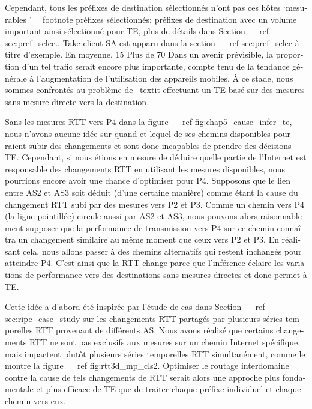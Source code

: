 \begin{otherlanguage}{french}
Cependant, tous les préfixes de destination sélectionnés n'ont pas ces hôtes `mesurables '~ \ footnote {préfixes sélectionnés: préfixes de destination avec un volume important ainsi sélectionné pour TE, plus de détails dans Section ~ \ ref {sec:pref_selec}.}.
Take client SA est apparu dans la section ~ \ ref {sec:pref_selec} à titre d'exemple.
En moyenne, 15%
Plus de 70%
Dans un avenir prévisible, la proportion d'un tel trafic serait encore plus importante, compte tenu de la tendance générale à l'augmentation de l'utilisation des appareils mobiles.
À ce stade, nous sommes confrontés au problème de \ textit {effectuant un TE basé sur des mesures sans mesure directe vers la destination}.

Sans les mesures RTT vers P4 dans la figure ~ \ ref {fig:chap5_cause_infer_te}, nous n'avons aucune idée sur quand et lequel de ses chemins disponibles pourraient subir des changements et sont donc incapables de prendre des décisions TE.
Cependant, si nous étions en mesure de déduire quelle partie de l'Internet est responsable des changements RTT en utilisant les mesures disponibles, nous pourrions encore avoir une chance d'optimiser pour P4.
Supposons que le lien entre AS2 et AS3 soit déduit (d'une certaine manière) comme étant la cause du changement RTT subi par des mesures vers P2 et P3.
Comme un chemin vers P4 (la ligne pointillée) circule aussi par AS2 et AS3, nous pouvons alors raisonnablement supposer que la performance de transmission vers P4 sur ce chemin connaîtra un changement similaire au même moment que ceux vers P2 et P3.
En réalisant cela, nous allons passer à des chemins alternatifs qui restent inchangés pour atteindre P4.
C'est ainsi que la RTT change parce que l'inférence éclaire les variations de performance vers des destinations sans mesures directes et donc permet à TE.

Cette idée a d'abord été inspirée par l'étude de cas dans Section ~ \ ref {sec:ripe_case_study} sur les changements RTT partagés par plusieurs séries temporelles RTT provenant de différents AS.
Nous avons réalisé que certains changements RTT ne sont pas exclusifs aux mesures sur un chemin Internet spécifique, mais impactent plutôt plusieurs séries temporelles RTT simultanément, comme le montre la figure ~ \ ref {fig:rtt3d_mp_cls2}.
Optimiser le routage interdomaine contre la cause de tels changements de RTT serait alors une approche plus fondamentale et plus efficace de TE que de traiter chaque préfixe individuel et chaque chemin vers eux.


\end{otherlanguage}
